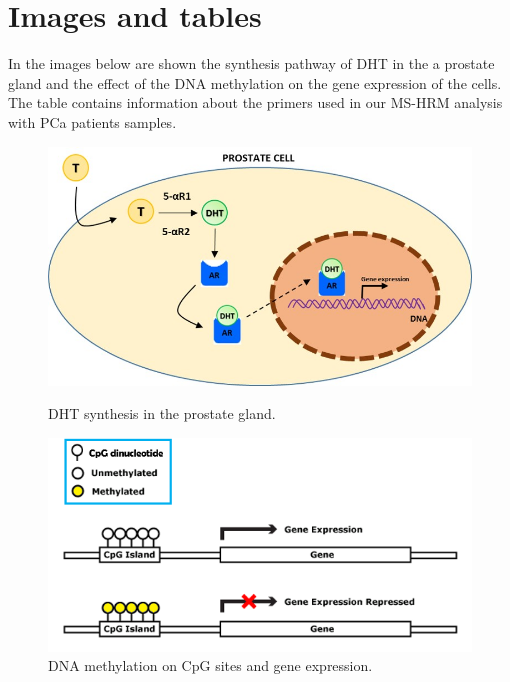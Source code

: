 \documentclass[a4paper,11pt]{article}
\begin{document}
\section{Images and tables}
In the images below are shown the synthesis pathway of DHT in the a prostate gland and the effect of the DNA methylation on the gene expression of the cells. The table contains information about the primers used in our MS-HRM analysis with PCa patients samples.

\begin{figure}[h!]

	\includegraphics[scale=0.6]{Imagen_DHT}
	\caption{DHT synthesis in the prostate gland.} \label{Imagen_DHT} 
	\includegraphics[scale=0.9]{Imagen_DNAmeth}
	\caption{DNA methylation on CpG sites and gene expression.} \label{Imagen_DNAmeth} 

 \end{figure} 
\end{document}
